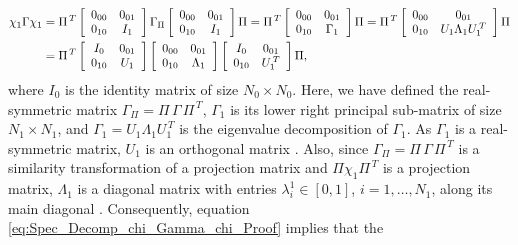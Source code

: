 \documentclass{cmslatex}
\begin{document}
\begin{align}\label{eq:Spec_Decomp_chi_Gamma_chi_Proof}
  \chi_1\Gamma\chi_1&=
  \Pi^{\,T}
  \left[
  \begin{array}{ccc}
    0_{00}&0_{01}\\
    0_{10}&I_1   
    \end{array}
\right]
\Gamma_\Pi
\left[
  \begin{array}{ccc}
    0_{00}&0_{01}\\
    0_{10}&I_1   
    \end{array}
\right]
\Pi
=
\Pi^{\,T}
\left[
  \begin{array}{ccc}
    0_{00}&0_{01}\\
    0_{10}&\Gamma_1   
    \end{array}
\right]
\Pi
=
\Pi^{\,T}
\left[
  \begin{array}{ccc}
    0_{00}&0_{01}\\
    0_{10}&U_1\Lambda_1U_1^{\,T} 
    \end{array}
\right]
\Pi
\notag\\
&=
\Pi^{\,T}
\left[
  \begin{array}{ccc}
    I_0&0_{01}\\
    0_{10}&U_1 
    \end{array}
\right]    
\left[
  \begin{array}{ccc}
    0_{00}&0_{01}\\
    0_{10}&\Lambda_1
    \end{array}
\right]    
\left[
  \begin{array}{ccc}
    I_0&0_{01}\\
    0_{10}&U_1^{\,T} 
    \end{array}
\right]    
\Pi,
\end{align}
%
where $I_0$ is the identity matrix of size $N_0\times N_0$. Here, we have
defined the real-symmetric matrix $\Gamma_\Pi=\Pi\,\Gamma\,\Pi^{\,T}$, $\Gamma_1$ is its
lower right principal sub-matrix of size $N_1\times N_1$, and
$\Gamma_1=U_1\Lambda_1U_1^{\,T}$ is the eigenvalue decomposition of $\Gamma_1$. As
$\Gamma_1$ is a real-symmetric matrix, $U_1$ is an orthogonal matrix
\cite{Horn_Johnson-1990}. Also, since $\Gamma_\Pi=\Pi\,\Gamma\,\Pi^{\,T}$ is a
similarity transformation of a projection matrix and $\Pi\chi_1\Pi^{\,T}$ is
a projection matrix, $\Lambda_1$ is a diagonal matrix with entries
$\lambda_i^1\in[0,1]$, $i=1,\ldots,N_1$, along its main diagonal 
\cite{Horn_Johnson-1990,Demmel:1997}. Consequently, equation  
\eqref{eq:Spec_Decomp_chi_Gamma_chi_Proof} implies that the
\end{document}
